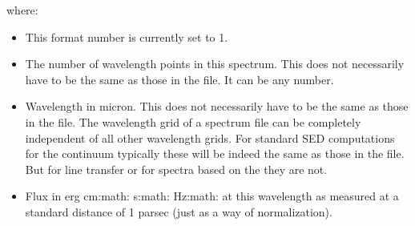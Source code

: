 \documentclass[letterpaper,10pt,english]{sphinxmanual}
\begin{document}
\begin{sphinxVerbatim}[commandchars=\\\{\}]
                           

\PYG{p}{[}\PYG{p}{]}       \PYG{p}{[}\PYG{p}{]}
                 
                 
\PYG{p}{[}\PYG{p}{]}   \PYG{p}{[}\PYG{p}{]}
\end{sphinxVerbatim}

where:
\begin{itemize}
\item {} 
 This format number is currently set to 1.

\item {} 
 The number of wavelength points in this spectrum.
This does not necessarily have to be the same as those in the
 file. It can be any number.

\item {} 
 Wavelength in micron.  This does not necessarily
have to be the same as those in the  file.
The wavelength grid of a spectrum file can be completely independent
of all other wavelength grids. For standard SED computations for the
continuum typically these will be indeed the same as those in the
 file. But for line transfer or for
spectra based on the  they are
not.

\item {} 
 Flux in erg cm:math: s:math: Hz:math: at this
wavelength as measured at a standard distance of 1 parsec (just as a way
of normalization).

\end{itemize}

\end{document}
